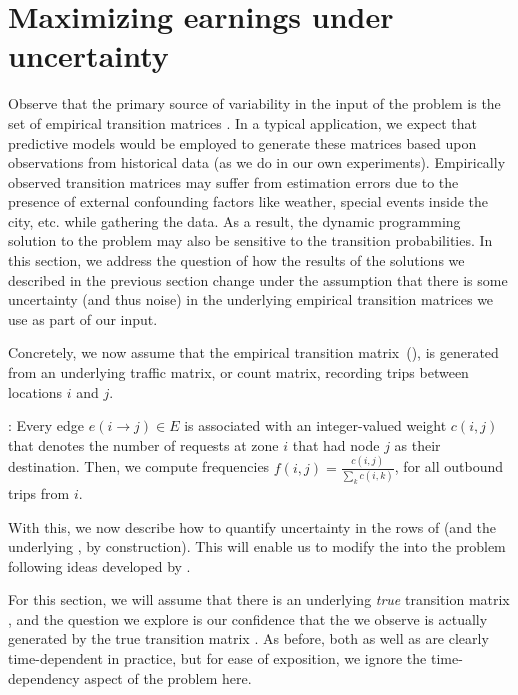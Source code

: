 

\section{Maximizing earnings under uncertainty}
\label{sec:sensitivity}
Observe that the primary source of variability in the input of the {\originalproblem} problem
is the set of empirical transition matrices {\empiricaltransitionmatrix}.  In a typical application,
we expect that predictive models would be employed to generate these matrices based upon observations
from historical data (as we do in our own experiments).  Empirically observed transition matrices may 
suffer from estimation errors due to the presence of external confounding factors like weather, special 
events inside the city, etc. while gathering the data. As a result, the dynamic programming solution 
to the {\originalproblem} problem may also be sensitive to the transition probabilities. In this section, 
we address the question of how the results of the solutions we described in the previous section change 
under the assumption that there is some uncertainty (and thus noise) in the underlying empirical transition 
matrices we use as part of our input.

Concretely, we now assume that the empirical transition matrix~(\empiricaltransitionmatrix),  is generated from an 
underlying traffic matrix, or count matrix, recording trips between locations $i$ and $j$.

:
Every edge $e(i\rightarrow j) \in E$ is associated with an
integer-valued weight $c(i,j)$ that denotes the number of requests
at zone $i$ that had node $j$ as their destination.
Then, we compute frequencies $f(i,j) = \frac{c(i,j)}{\sum_k c(i,k)}$, for all outbound trips from $i$.

With this, we now describe how to quantify uncertainty in the rows of {\empiricaltransitionmatrix} 
(and the underlying {\countmatrix}, by construction). This will enable us to  
modify the {\originalproblem} into the {\robustproblem} problem following ideas developed
by \citet{nilim2004robustness}.



For this section, we will assume that there is an underlying \emph{true} transition matrix
{\truetransitionmatrix}, and the question we explore is 
our confidence that the
{\countmatrix} we observe is actually 
generated by the true transition matrix {\truetransitionmatrix}.  As before, both 
{\truetransitionmatrix} as well as {\countmatrix} are clearly time-dependent in practice,
but for ease of exposition, we ignore the time-dependency aspect of the problem here.

